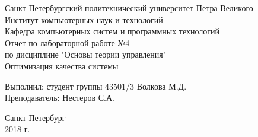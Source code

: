 	\begin{titlepage}
		\begin{center}
			Санкт-Петербургский политехнический университет Петра Великого\\
			Институт компьютерных наук и технологий\\
			Кафедра компьютерных систем и программных технологий\\
			\vspace{6cm}
			Отчет по лабораторной работе №4\\
			\vspace{0.2cm}	
			по дисциплине "Основы теории управления"\\
			\vspace{0.5cm}	
			\Large
			Оптимизация качества системы
			\small
		\end{center}
		\vspace{5cm}
		\begin{flushright}
			Выполнил: студент группы 43501/3	Волкова М.Д.\\
			\vspace{0.5cm}			
			Преподаватель: Нестеров С.А.\\
		\end{flushright}
		\vspace{7cm}
		\begin{center}
			Санкт-Петербург\\
			2018 г.\\
		\end{center}
	\end{titlepage}
	\newpage